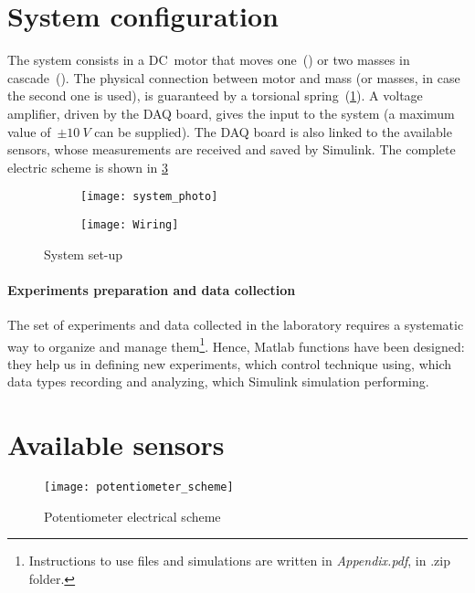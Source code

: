 
\section{System configuration}

The system consists in a DC~motor that moves one~(\onedof) or two masses in cascade~(\twodof). The physical connection between motor and mass (or masses, in case the second one is used), is guaranteed by a torsional spring~(\cref{fig:system_setup}).
A voltage amplifier, driven by the DAQ board, gives the input to the system (a maximum value of~$\pm 10 \ V$ can be supplied). The DAQ board is also linked to the available sensors, whose measurements are received and saved by Simulink. The complete electric scheme is shown in \cref{fig:wiring}
\begin{figure}[h]
	\centering
	\begin{subfigure}{0.45\columnwidth}
		\texttt{[image: system\_photo]}
		\label{fig:system_setup}
	\end{subfigure}
	\begin{subfigure}{0.45\columnwidth}
		\centering
		\texttt{[image: Wiring]}
		\label{fig:wiring}
	\end{subfigure}
	\caption{System set-up}
\end{figure}

\paragraph{Experiments preparation and data collection}

The set of experiments and data collected in the laboratory requires a systematic way to organize and manage them\footnote{Instructions to use files and simulations are written in \textit{Appendix.pdf}, in .zip folder.}. Hence, Matlab functions have been designed: they help us in defining new experiments, which control technique using, which data types recording and analyzing, which Simulink simulation performing.

\section{Available sensors}
\label{sec:sensors}

\begin{wrapfigure}{r}{0.3\textwidth}
	\centering
	\texttt{[image: potentiometer\_scheme]}
	\caption{Potentiometer electrical scheme}
\end{wrapfigure}

